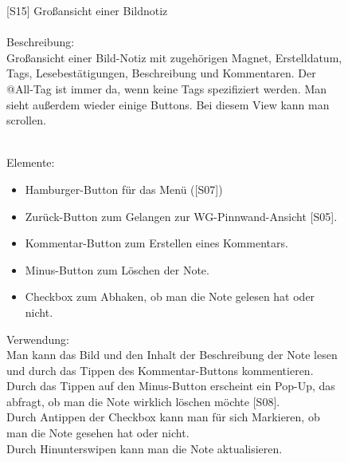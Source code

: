 \documentclass[a4paper]{scrreprt}
\begin{document}
\begin{figure}[h!]
    		\hspace{0.5cm}
    		\begin{minipage}[t]{0.55\linewidth}
    			\flushleft
    			\vspace{9mm}
    			{[}S15{]} Großansicht einer Bildnotiz \\
    			\hfill
    			\\
    			Beschreibung: \\
    			Großansicht einer Bild-Notiz mit zugehörigen Magnet, Erstelldatum, Tags, Lesebestätigungen, Beschreibung und Kommentaren. Der @All-Tag ist immer da, wenn keine Tags spezifiziert werden. Man sieht außerdem wieder einige Buttons. Bei diesem View kann man scrollen.
    			
    			\hfill 
    			\\Elemente:\\
    			\begin{itemize}
    				\renewcommand\labelitemi{--}
    				\item  Hamburger-Button für das Menü ({[}S07{]})
    				\item Zurück-Button zum Gelangen zur
    				WG-Pinnwand-Ansicht {[}S05{]}.
    				\item Kommentar-Button zum Erstellen eines
    				Kommentars.
    				\item Minus-Button zum Löschen der Note.
    				\item Checkbox zum Abhaken, ob man die Note gelesen hat oder nicht.
    				
    			\end{itemize}
    			
    			
    			\hfill 
    			
    			Verwendung:\\
    			Man kann das Bild und den Inhalt der
    			Beschreibung der Note lesen und durch
    			das Tippen des Kommentar-Buttons
    			kommentieren. \\
    			Durch das Tippen auf den 
    			Minus-Button erscheint ein Pop-Up, das abfragt, ob man die Note wirklich löschen möchte {[}S08{]}.\\ 
    			Durch Antippen der Checkbox kann man für sich Markieren, ob man die Note gesehen hat oder nicht.\\ 
    			Durch Hinunterswipen kann man die Note aktualisieren.
    			
    		\end{minipage}
    	\end{figure}
    	
    	\clearpage
    	
\end{document}
